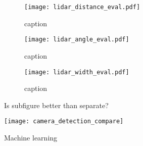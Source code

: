 \begin{figure}[htb]
	\centering
	\begin{subfigure}{1\textwidth}
		\centering
		\texttt{[image: lidar\_distance\_eval.pdf]}
		\caption{caption}
		\label{fig:lidar_distance_evalTest}
	\end{subfigure}
	
	\begin{subfigure}{1\textwidth}
		\centering
		\texttt{[image: lidar\_angle\_eval.pdf]}
		\caption{caption}
		\label{fig:lidar_angle_evalTest}
	\end{subfigure}
	
	\begin{subfigure}{1\textwidth}
		\centering
		\texttt{[image: lidar\_width\_eval.pdf]}
		\caption{caption}
		\label{fig:lidar_width_evalTest}
	\end{subfigure}
	\caption{Is subfigure better than separate?}
	\label{fig:subFigTest}
\end{figure}

\begin{figure}[htbp]
	\centering
	\texttt{[image: camera\_detection\_compare]}
	\caption{Machine learning}
	\label{fig:camera_detection_compare}
\end{figure}
